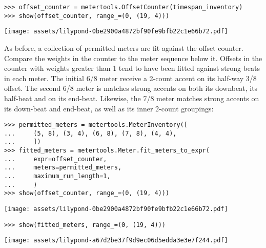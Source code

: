 \begin{abjadbookoutput}
\begin{singlespacing}
\vspace{-0.5\baselineskip}
\begin{lstlisting}
>>> offset_counter = metertools.OffsetCounter(timespan_inventory)
>>> show(offset_counter, range_=(0, (19, 4)))
\end{lstlisting}
\noindent\texttt{[image: assets/lilypond-0be2900a4872bf90fe9bfb22c1e66b72.pdf]}
\end{singlespacing}
\end{abjadbookoutput}

\noindent As before, a collection of permitted meters are fit against the
offset counter. Compare the weights in the counter to the meter sequence below
it. Offsets in the counter with weights greater than 1 tend to have been fitted
against strong beats in each meter. The initial 6/8 meter receive a 2-count
accent on its half-way 3/8 offset. The second 6/8 meter is matches strong
accents on both its downbeat, its half-beat and on its end-beat. Likewise, the
7/8 meter matches strong accents on its down-beat and end-beat, as well as its
inner 2-count groupings:

\begin{comment}
<abjad>
permitted_meters = metertools.MeterInventory([
    (5, 8), (3, 4), (6, 8), (7, 8), (4, 4),
    ])
fitted_meters = metertools.Meter.fit_meters_to_expr(
    expr=offset_counter,
    meters=permitted_meters,
    maximum_run_length=1,
    )
show(offset_counter, range_=(0, (19, 4)))
show(fitted_meters, range_=(0, (19, 4)))
</abjad>
\end{comment}

\begin{abjadbookoutput}
\begin{singlespacing}
\vspace{-0.5\baselineskip}
\begin{lstlisting}
>>> permitted_meters = metertools.MeterInventory([
...     (5, 8), (3, 4), (6, 8), (7, 8), (4, 4),
...     ])
>>> fitted_meters = metertools.Meter.fit_meters_to_expr(
...     expr=offset_counter,
...     meters=permitted_meters,
...     maximum_run_length=1,
...     )
>>> show(offset_counter, range_=(0, (19, 4)))
\end{lstlisting}
\noindent\texttt{[image: assets/lilypond-0be2900a4872bf90fe9bfb22c1e66b72.pdf]}
\begin{lstlisting}
>>> show(fitted_meters, range_=(0, (19, 4)))
\end{lstlisting}
\noindent\texttt{[image: assets/lilypond-a67d2be37f9d9ec06d5edda3e3e7f244.pdf]}
\end{singlespacing}
\end{abjadbookoutput}

